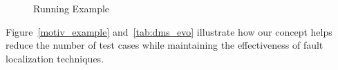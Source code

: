 \begin{figure}[tbp]
  \caption{Running Example}
  \label{fig:motiv-example}
\end{figure}

Figure~\ref{motiv_example} and~\ref{tab:dms_evo} illustrate how our concept helps reduce the number of test cases while maintaining the effectiveness of fault localization techniques.

